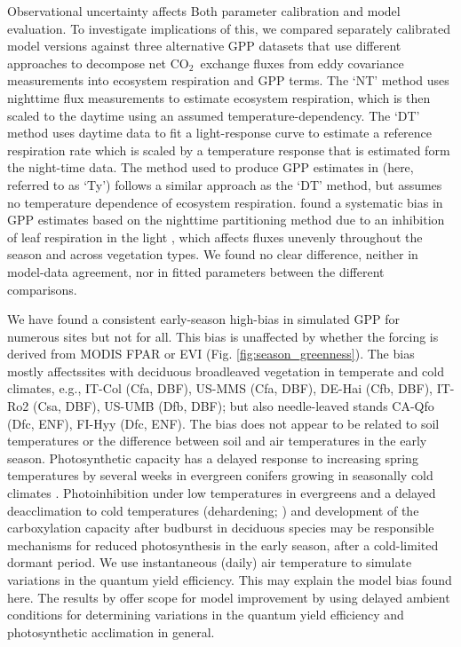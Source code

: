 \documentclass{myreport}
\newcommand{\coo}{CO$_2$}
\begin{document}
Observational uncertainty affects Both parameter calibration and model evaluation. To investigate implications of this, we compared separately calibrated model versions against three alternative GPP datasets that use different approaches to decompose net \coo\ exchange fluxes from eddy covariance measurements into ecosystem respiration and GPP terms. The `NT' method \citep{Reichstein2005-mp} uses nighttime flux measurements to estimate ecosystem respiration, which is then scaled to the daytime using an assumed temperature-dependency. The `DT' method \citep{lasslop10} uses daytime data to fit a light-response curve to estimate a reference respiration rate which is scaled by a temperature response that is estimated form the night-time data. The method used to produce GPP estimates in \cite{wang17rs} (here, referred to as `Ty') follows a similar approach as the `DT' method, but assumes no temperature dependence of ecosystem respiration. \cite{keenan19natee} found a systematic bias in GPP estimates based on the nighttime partitioning method due to an inhibition of leaf respiration in the light \citep{kok49, wehr16}, which affects fluxes unevenly throughout the season and across vegetation types. We found no clear difference, neither in model-data agreement, nor in fitted parameters between the different comparisons.

We have found a consistent early-season high-bias in simulated GPP for numerous sites but not for all. This bias is unaffected by whether the forcing is derived from MODIS FPAR or EVI (Fig. \ref{fig:season_greenness}). The bias mostly affectssites with deciduous broadleaved vegetation in temperate and cold climates, e.g., IT-Col (Cfa, DBF), US-MMS (Cfa, DBF), DE-Hai (Cfb, DBF), IT-Ro2 (Csa, DBF), US-UMB (Dfb, DBF); but also needle-leaved stands CA-Qfo (Dfc, ENF), FI-Hyy (Dfc, ENF). The bias does not appear to be related to soil temperatures or the difference between soil and air temperatures in the early season. Photosynthetic capacity has a delayed response to increasing spring temperatures by several weeks in evergreen conifers growing in seasonally cold climates
\citep{pelkonen80, bergh98, makela04}. Photoinhibition under low temperatures in evergreens \citep{huner93} and a delayed deacclimation to cold temperatures (dehardening; \cite{vitasse14}) and development of the carboxylation capacity after budburst in deciduous species may be responsible mechanisms for reduced photosynthesis in the early season, after a cold-limited dormant period. We use instantaneous (daily) air temperature to simulate variations in the quantum yield efficiency. This may explain the model bias found here. The results by \cite{makela04} offer scope for model improvement by using delayed ambient conditions for determining variations in the quantum yield efficiency and photosynthetic acclimation in general.
\end{document}
